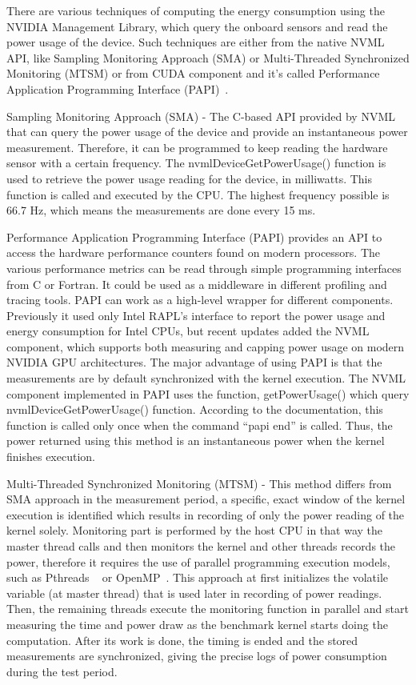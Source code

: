 There are various techniques of computing the energy consumption
using the NVIDIA Management Library, which query the onboard
sensors and read the power usage of the device. Such techniques
are either from the native NVML API, like Sampling Monitoring
Approach (SMA) or Multi-Threaded Synchronized Monitoring (MTSM)
or from CUDA component and it’s called Performance Application
Programming Interface (PAPI)~\cite{PAPI_CUDA}.

Sampling Monitoring Approach (SMA) - The C-based API provided
by NVML that can query the power usage of the device and provide
an instantaneous power measurement. Therefore, it can be
programmed to keep reading the hardware sensor with a certain
frequency. The nvmlDeviceGetPowerUsage() function is used to
retrieve the power usage reading for the device, in milliwatts.
This function is called and executed by the CPU. The highest
frequency possible is 66.7 Hz, which means the measurements are
done every 15 ms.

Performance Application Programming Interface (PAPI) provides
an API to access the hardware performance counters found on
modern processors. The various performance metrics can be read
through simple programming interfaces from C or Fortran. It
could be used as a middleware in different profiling and tracing
tools. PAPI can work as a high-level wrapper for different
components. Previously it used only Intel RAPL's interface to
report the power usage and energy consumption for Intel CPUs,
but recent updates added the NVML component, which supports
both measuring and capping power usage on modern NVIDIA GPU
architectures. The major advantage of using PAPI is that the
measurements are by default synchronized with the kernel execution.
The NVML component implemented in PAPI uses the function,
getPowerUsage() which query nvmlDeviceGetPowerUsage() function.
According to the documentation, this function is called only
once when the command “papi end” is called. Thus, the power
returned using this method is an instantaneous power when the
kernel finishes execution.

Multi-Threaded Synchronized Monitoring (MTSM) - This method
differs from SMA approach in the measurement period, a specific,
exact window of the kernel execution is identified which results
in recording of only the power reading of the kernel solely.
Monitoring part is performed by the host CPU in that way the
master thread calls and then monitors the kernel and other
threads records the power, therefore it requires the use of
parallel programming execution models, such as Pthreads
~\cite{Pthreads} or
OpenMP~\cite{OpenMP}. This approach at first initializes the volatile
variable (at master thread) that is used later in recording of
power readings. Then, the remaining threads execute the monitoring
function in parallel and start measuring the time and power draw
as the benchmark kernel starts doing the computation. After its
work is done, the timing is ended and the stored measurements
are synchronized, giving the precise logs of power consumption
during the test period.

